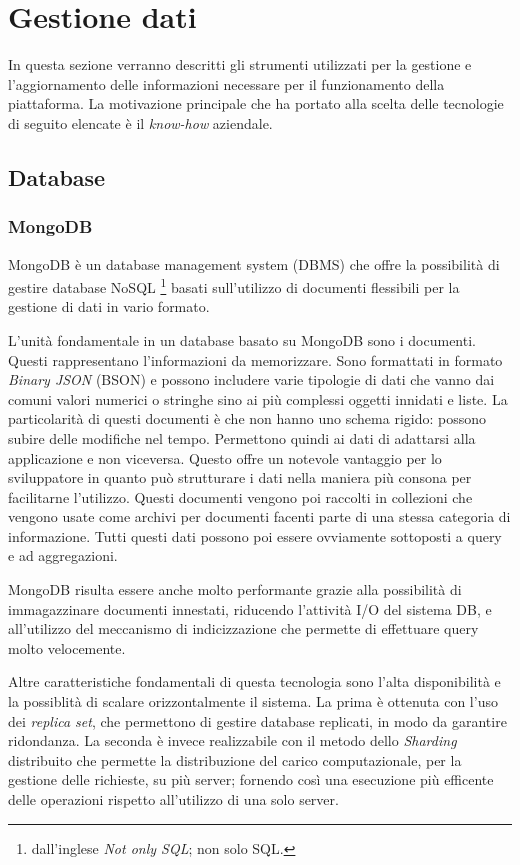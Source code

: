 \section{Gestione dati}
In questa sezione verranno descritti gli strumenti utilizzati per la gestione e l'aggiornamento delle informazioni
necessare per il funzionamento della piattaforma.
La motivazione principale che ha portato alla scelta delle tecnologie di seguito elencate è il \textit{know-how} aziendale.

\subsection{Database}
\subsubsection{MongoDB}
MongoDB\cite{MongoDB} è un database management system (DBMS) che offre la possibilità di gestire database NoSQL
\footnote{
    dall'inglese \textit{Not only SQL}; non solo SQL.
} basati sull'utilizzo di documenti flessibili per la gestione di dati in vario formato.\cite{IBM-MongoDB}

L'unità fondamentale in un database basato su MongoDB sono i documenti. Questi rappresentano l'informazioni da memorizzare.
Sono formattati in formato \textit{Binary JSON} (BSON) e possono includere varie tipologie di dati che vanno dai comuni
valori numerici o stringhe sino ai più complessi oggetti innidati e liste.
La particolarità di questi documenti è che non hanno uno schema rigido: possono subire delle modifiche nel tempo. Permettono quindi
ai dati di adattarsi alla applicazione e non viceversa. Questo offre un notevole vantaggio per lo sviluppatore
in quanto può strutturare i dati nella maniera più consona per facilitarne l'utilizzo.
Questi documenti vengono poi raccolti in collezioni che vengono usate come archivi per documenti facenti parte di una stessa categoria di informazione.
Tutti questi dati possono poi essere ovviamente sottoposti a query e ad aggregazioni.

MongoDB risulta essere anche molto performante grazie alla possibilità di immagazzinare documenti innestati, riducendo l'attività I/O del sistema DB,
e all'utilizzo del meccanismo di indicizzazione che permette di effettuare query molto velocemente.

Altre caratteristiche fondamentali di questa tecnologia sono l'alta disponibilità e la possiblità di scalare orizzontalmente il sistema.
La prima è ottenuta con l'uso dei \textit{replica set}, che permettono di gestire database replicati, in modo da garantire ridondanza.
La seconda è invece realizzabile con il metodo dello \textit{Sharding} distribuito che permette
la distribuzione del carico computazionale, per la gestione delle richieste, su più server; fornendo così una esecuzione più efficente delle operazioni rispetto all'utilizzo di una solo server.


